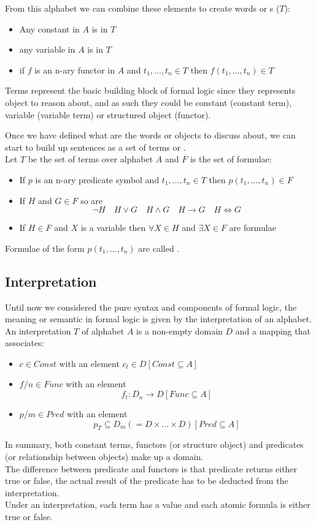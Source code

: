 From this alphabet we can combine these elements to create words or s ($T$):
\begin{itemize}
\item Any constant in $A$ is in $T$
\item any variable in $A$ is in $T$
\item if $f$ is an n-ary functor in $A$ and $t_1, ... , t_n \in T$ then $f(t_1,..., t_n) \in T$
\end{itemize}
Terms represent the basic building block of formal logic since they represents object to reason about, and as such they could be constant (constant term), variable (variable term) or structured object (functor).

Once we have defined what are the words or objects to discuss about, we can start to build up sentences as a set of terms or .\\
Let $T$ be the set of terms over alphabet $A$ and $F$ is the set of formulae:
\begin{itemize}
\item If $p$ is an n-ary predicate symbol and $t_1,...,t_n \in T$ then $p(t_1,...,t_n) \in F$
\item If $H$ and $G \in F$ so are 
\[\neg{H} \quad H\lor G \quad H\land G \quad H \rightarrow G \quad H\iff G\]
\item If $H\in F$ and $X$ is a variable then $\forall X \in H$ and $\exists X \in F$ are formulae
\end{itemize}
Formulae of the form $p(t_1,..., t_n)$ are called .

\subsection{Interpretation}
Until now we considered the pure syntax and components of formal logic, the meaning or semantic in formal logic is given by the interpretation of an alphabet.\\
An interpretation $T$ of alphabet $A$ is a non-empty domain $D$ and a mapping that associates:
\begin{itemize}
\item $c \in Const$ with an element $c_t \in D [Const \subseteq A]$
\item $f/n \in Func$ with an element 
\[f_t: D_n \rightarrow D [Func\subseteq A]\]
\item $p/m \in Pred$ with an element 
\[p_T \subseteq D_m (= D\times ... \times D) [Pred\subseteq A]\]
\end{itemize}
In summary, both constant terms, functors (or structure object) and predicates (or relationship between objects) make up a domain.\\
The difference between predicate and functors is that predicate returns either true or false, the actual result of the predicate has to be deducted from the interpretation.\\
Under an interpretation, each term has a value and each atomic formula is either true or false.

